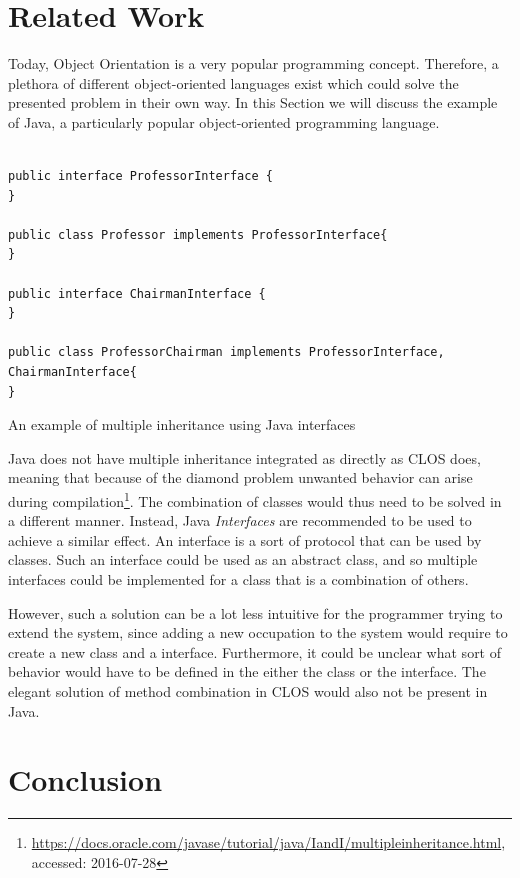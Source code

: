 \documentclass[oribibl]{llncs}
\begin{document}
\section{Related Work}
\label{sec:related}

Today, Object Orientation is a very popular programming concept. Therefore, a plethora of different object-oriented languages exist which could solve the presented problem in their own way. In this Section we will discuss the example of Java, a particularly popular object-oriented programming language.

\begin{listing}[]
\begin{verbatim}

public interface ProfessorInterface {
}

public class Professor implements ProfessorInterface{
}

public interface ChairmanInterface {
}

public class ProfessorChairman implements ProfessorInterface, ChairmanInterface{
}

\end{verbatim}
\caption{An example of multiple inheritance using Java interfaces}
\label{lst:java}
\end{listing}

Java does not have multiple inheritance integrated as directly as CLOS does, meaning that because of the diamond problem unwanted behavior can arise during compilation\footnote{\url{https://docs.oracle.com/javase/tutorial/java/IandI/multipleinheritance.html}, accessed: 2016-07-28}. The combination of classes would thus need to be solved in a different manner. Instead, Java \emph{Interfaces} are recommended to be used to achieve a similar effect. An interface is a sort of protocol that can be used by classes. Such an interface could be used as an abstract class, and so multiple interfaces could be implemented for a class that is a combination of others. 

However, such a solution can be a lot less intuitive for the programmer trying to extend the system, since adding a new occupation to the system would require to create a new class and a interface. Furthermore, it could be unclear what sort of behavior would have to be defined in the either the class or the interface. The elegant solution of method combination in CLOS would also not be present in Java. 


\section{Conclusion}
\label{sec:conclusion}
\end{document}
